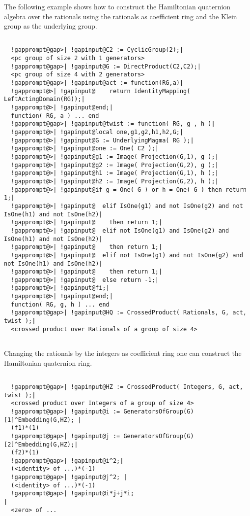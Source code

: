 \documentclass[a4paper,11pt]{report}
\begin{document}
{{{\begin{Verbatim}[commandchars=!@|,fontsize=\small,frame=single,label=Example]
\end{Verbatim}
 The following example shows how to construct the Hamiltonian quaternion
algebra over the rationals using the rationals as coefficient ring and the
Klein group as the underlying group. 
\begin{Verbatim}[commandchars=!@|,fontsize=\small,frame=single,label=Example]
  
  !gapprompt@gap>| !gapinput@C2 := CyclicGroup(2);|
  <pc group of size 2 with 1 generators>
  !gapprompt@gap>| !gapinput@G := DirectProduct(C2,C2);|
  <pc group of size 4 with 2 generators>
  !gapprompt@gap>| !gapinput@act := function(RG,a)|
  !gapprompt@>| !gapinput@    return IdentityMapping( LeftActingDomain(RG));|
  !gapprompt@>| !gapinput@end;|
  function( RG, a ) ... end
  !gapprompt@gap>| !gapinput@twist := function( RG, g , h )|
  !gapprompt@>| !gapinput@local one,g1,g2,h1,h2,G;|
  !gapprompt@>| !gapinput@G := UnderlyingMagma( RG );|
  !gapprompt@>| !gapinput@one := One( C2 );|
  !gapprompt@>| !gapinput@g1 := Image( Projection(G,1), g );|
  !gapprompt@>| !gapinput@g2 := Image( Projection(G,2), g );|
  !gapprompt@>| !gapinput@h1 := Image( Projection(G,1), h );|
  !gapprompt@>| !gapinput@h2 := Image( Projection(G,2), h );|
  !gapprompt@>| !gapinput@if g = One( G ) or h = One( G ) then return 1;|
  !gapprompt@>| !gapinput@  elif IsOne(g1) and not IsOne(g2) and not IsOne(h1) and not IsOne(h2)|
  !gapprompt@>| !gapinput@    then return 1;|
  !gapprompt@>| !gapinput@  elif not IsOne(g1) and IsOne(g2) and IsOne(h1) and not IsOne(h2)|
  !gapprompt@>| !gapinput@    then return 1;|
  !gapprompt@>| !gapinput@  elif not IsOne(g1) and not IsOne(g2) and not IsOne(h1) and IsOne(h2)|
  !gapprompt@>| !gapinput@    then return 1;|
  !gapprompt@>| !gapinput@  else return -1;|
  !gapprompt@>| !gapinput@fi;|
  !gapprompt@>| !gapinput@end;|
  function( RG, g, h ) ... end
  !gapprompt@gap>| !gapinput@HQ := CrossedProduct( Rationals, G, act, twist );|
  <crossed product over Rationals of a group of size 4>
  
\end{Verbatim}
 Changing the rationals by the integers as coefficient ring one can construct
the Hamiltonian quaternion ring. 
\begin{Verbatim}[commandchars=!@|,fontsize=\small,frame=single,label=Example]
  
  !gapprompt@gap>| !gapinput@HZ := CrossedProduct( Integers, G, act, twist );|
  <crossed product over Integers of a group of size 4>
  !gapprompt@gap>| !gapinput@i := GeneratorsOfGroup(G)[1]^Embedding(G,HZ); |
  (f1)*(1)
  !gapprompt@gap>| !gapinput@j := GeneratorsOfGroup(G)[2]^Embedding(G,HZ);|
  (f2)*(1)
  !gapprompt@gap>| !gapinput@i^2;|
  (<identity> of ...)*(-1)
  !gapprompt@gap>| !gapinput@j^2; |
  (<identity> of ...)*(-1)
  !gapprompt@gap>| !gapinput@i*j+j*i;                                      |
  <zero> of ...
  

\end{Verbatim}}}}
\end{document}
